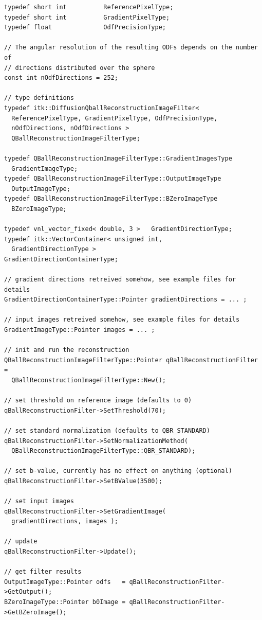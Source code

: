 \documentclass{InsightArticle}
\begin{document}
\small
\begin{verbatim}
typedef short int          ReferencePixelType;
typedef short int          GradientPixelType;
typedef float              OdfPrecisionType;

// The angular resolution of the resulting ODFs depends on the number of
// directions distributed over the sphere
const int nOdfDirections = 252;

// type definitions
typedef itk::DiffusionQballReconstructionImageFilter< 
  ReferencePixelType, GradientPixelType, OdfPrecisionType, 
  nOdfDirections, nOdfDirections > 
  QBallReconstructionImageFilterType;

typedef QBallReconstructionImageFilterType::GradientImagesType 
  GradientImageType;
typedef QBallReconstructionImageFilterType::OutputImageType 
  OutputImageType;
typedef QBallReconstructionImageFilterType::BZeroImageType 
  BZeroImageType;

typedef vnl_vector_fixed< double, 3 >   GradientDirectionType;
typedef itk::VectorContainer< unsigned int, 
  GradientDirectionType >               GradientDirectionContainerType;

// gradient directions retreived somehow, see example files for details
GradientDirectionContainerType::Pointer gradientDirections = ... ;

// input images retreived somehow, see example files for details
GradientImageType::Pointer images = ... ;

// init and run the reconstruction
QBallReconstructionImageFilterType::Pointer qBallReconstructionFilter = 
  QBallReconstructionImageFilterType::New();

// set threshold on reference image (defaults to 0)
qBallReconstructionFilter->SetThreshold(70);

// set standard normalization (defaults to QBR_STANDARD)
qBallReconstructionFilter->SetNormalizationMethod(
  QBallReconstructionImageFilterType::QBR_STANDARD);

// set b-value, currently has no effect on anything (optional)
qBallReconstructionFilter->SetBValue(3500);

// set input images
qBallReconstructionFilter->SetGradientImage( 
  gradientDirections, images );

// update
qBallReconstructionFilter->Update();

// get filter results
OutputImageType::Pointer odfs   = qBallReconstructionFilter->GetOutput();
BZeroImageType::Pointer b0Image = qBallReconstructionFilter->GetBZeroImage();
\end{verbatim}
\normalsize
\end{document}
